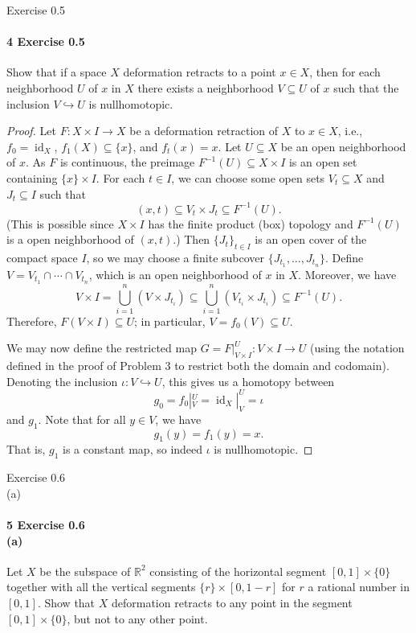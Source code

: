 \documentclass[12pt]{article}
\newlength{\myparskip}
\newenvironment{fullbox}{\begin{lrbox}{\savefullbox}\begin{minipage}{\dimexpr\textwidth-2\fboxsep\relax}\setlength{\parskip}{\myparskip}}{\end{minipage}\end{lrbox}\framebox[\textwidth]{\usebox{\savefullbox}}}
\newenvironment{pbox}[1][]{\begin{fullbox}\ifx#1\empty\else\paragraph{#1}\phantom{}\fi}{\end{fullbox}}
\theoremstyle{definition}
\newcommand{\R}{\mathbb{R}}
\newcommand{\<}{\langle}
\renewcommand{\>}{\rangle}
\DeclareMathOperator{\id}{id}
\newcommand{\inc}{\hookrightarrow}
\begin{document}
\newpage
\begin{pbox}[4 Exercise 0.5]
    Show that if a space $X$ deformation retracts to a point $x \in X$, then for each neighborhood $U$ of $x$ in $X$ there exists a neighborhood $V \subseteq U$ of $x$ such that the inclusion $V \inc U$ is nullhomotopic.
\end{pbox}

\begin{proof}
    Let $F : X \times I \to X$ be a deformation retraction of $X$ to $x \in X$, i.e., $f_0 = \id_X$, $f_1(X) \subseteq \{x\}$, and $f_t(x) = x$.
    Let $U \subseteq X$ be an open neighborhood of $x$.
    As $F$ is continuous, the preimage $F^{-1}(U) \subseteq X \times I$ is an open set containing $\{x\} \times I$.
    For each $t \in I$, we can choose some open sets $V_t \subseteq X$ and $J_t \subseteq I$ such that
    \[
        (x, t) \subseteq V_t \times J_t \subseteq F^{-1}(U).
    \]
    (This is possible since $X \times I$ has the finite product (box) topology and $F^{-1}(U)$ is a open neighborhood of $(x, t)$.)
    Then $\{J_t\}_{t \in I}$ is an open cover of the compact space $I$, so we may choose a finite subcover $\{J_{t_1}, \dots, J_{t_n}\}$.
    Define $V = V_{t_1} \cap \cdots \cap V_{t_n}$, which is an open neighborhood of $x$ in $X$. Moreover, we have
    \[
        V \times I
            = \bigcup_{i=1}^n (V \times J_{t_i})
            \subseteq \bigcup_{i=1}^n (V_{t_i} \times J_{t_i})
            \subseteq F^{-1}(U).
    \]
    Therefore, $F(V \times I) \subseteq U$; in particular, $V = f_0(V) \subseteq U$.

    We may now define the restricted map $G = F|_{V \times I}^U : V \times I \to U$ (using the notation defined in the proof of Problem 3 to restrict both the domain and codomain).
    Denoting the inclusion $\iota : V \inc U$, this gives us a homotopy between
    \[
        g_0 = f_0|_V^U = \id_X|_V^U = \iota
    \]
    and $g_1$.
    Note that for all $y \in V$, we have
    \[
        g_1(y) = f_1(y) = x.
    \]
    That is, $g_1$ is a constant map, so indeed $\iota$ is nullhomotopic.
\end{proof}


\newpage
\begin{pbox}[5 Exercise 0.6 \\ (a)]
    Let $X$ be the subspace of $\R^2$ consisting of the horizontal segment $[0, 1] \times \{0\}$ together with all the vertical segments $\{r\} \times [0, 1 - r]$ for $r$ a rational number in $[0, 1]$.
    Show that $X$ deformation retracts to any point in the segment $[0, 1] \times \{0\}$, but not to any other point.
\end{pbox}
\end{document}
